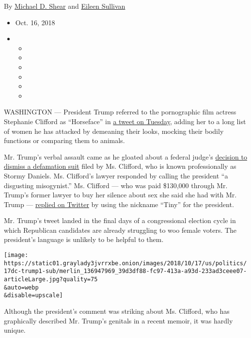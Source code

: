 By \href{https://www.nytimes3xbfgragh.onion/by/michael-d-shear}{Michael
D. Shear} and
\href{https://www.nytimes3xbfgragh.onion/by/eileen-sullivan}{Eileen
Sullivan}

\begin{itemize}
\item
  Oct. 16, 2018
\item
  \begin{itemize}
  \item
  \item
  \item
  \item
  \item
  \item
  \end{itemize}
\end{itemize}

WASHINGTON --- President Trump referred to the pornographic film actress
Stephanie Clifford as ``Horseface'' in
\href{https://twitter.com/realDonaldTrump/status/1052213711295930368}{a
tweet on Tuesday}, adding her to a long list of women he has attacked by
demeaning their looks, mocking their bodily functions or comparing them
to animals.

Mr. Trump's verbal assault came as he gloated about a federal judge's
\href{https://www.nytimes3xbfgragh.onion/2018/10/15/admin/stormy-daniels-lawsuit-dismissed-trump.html}{decision
to dismiss a defamation suit} filed by Ms. Clifford, who is known
professionally as Stormy Daniels. Ms. Clifford's lawyer responded by
calling the president ``a disgusting misogynist.'' Ms. Clifford --- who
was paid \$130,000 through Mr. Trump's former lawyer to buy her silence
about sex she said she had with Mr. Trump ---
\href{https://twitter.com/StormyDaniels/status/1052224021855637505}{replied
on Twitter} by using the nickname ``Tiny'' for the president.

Mr. Trump's tweet landed in the final days of a congressional election
cycle in which Republican candidates are already struggling to woo
female voters. The president's language is unlikely to be helpful to
them.

\texttt{[image: https://static01.graylady3jvrrxbe.onion/images/2018/10/17/us/politics/17dc-trump1-sub/merlin\_136947969\_39d3df88-fc97-413a-a93d-233ad3ceee07-articleLarge.jpg?quality=75\\\&auto=webp\\\&disable=upscale]}

Although the president's comment was striking about Ms. Clifford, who
has graphically described Mr. Trump's genitals in a recent memoir, it
was hardly unique.


